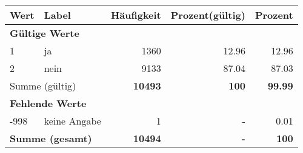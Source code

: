      \begin{longtable}{lXrrr}
     \toprule
     \textbf{Wert} & \textbf{Label} & \textbf{Häufigkeit} & \textbf{Prozent(gültig)} & \textbf{Prozent} \\
     \endhead
     \midrule
     \multicolumn{5}{l}{\textbf{Gültige Werte}}\\

     1 &
     \multicolumn{1}{X}{ ja   } &


       \num{1360} &
       \num[round-mode=places,round-precision=2]{12.96} &
         \num[round-mode=places,round-precision=2]{12.96} \\

     2 &
     \multicolumn{1}{X}{ nein   } &


       \num{9133} &
       \num[round-mode=places,round-precision=2]{87.04} &
         \num[round-mode=places,round-precision=2]{87.03} \\
     \midrule
     \multicolumn{2}{l}{Summe (gültig)} &
       \textbf{\num{10493}} &
     \textbf{\num{100}} &
       \textbf{\num[round-mode=places,round-precision=2]{99.99}} \\
     \multicolumn{5}{l}{\textbf{Fehlende Werte}}\\
       -998 &
       keine Angabe &
         \num{1} &
        - &
         \num[round-mode=places,round-precision=2]{0.01} \\
     \midrule
     \multicolumn{2}{l}{\textbf{Summe (gesamt)}} &
          \textbf{\num{10494}} &
        \textbf{-} &
        \textbf{\num{100}} \\
     \bottomrule
     \end{longtable}
     
